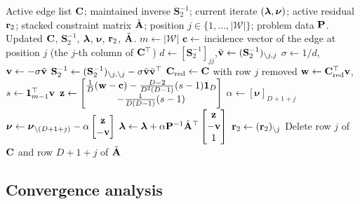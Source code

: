 \begin{algorithm}[H]
	\caption{Active-set KKT update when removing the edge at position $j$}
	\label{alg:active_set_remove_edge}
	\begin{algorithmic}[1]
		\renewcommand{\algorithmicrequire}{\textbf{Input:}}
		\renewcommand{\algorithmicensure}{\textbf{Output:}}
		\Require Active edge list $\C$; maintained inverse $\mathbf{S}_2^{-1}$; current iterate $(\lh,\boldsymbol{\nu})$; active residual $\r_2$; stacked constraint matrix $\tilde{\A}$; position $j\in\{1,\dots,|\mathcal{W}|\}$; problem data $\P$.
		\Ensure Updated $\C$, $\mathbf{S}_2^{-1}$, $\lh$, $\boldsymbol{\nu}$, $\r_2$, $\tilde{\A}$.
		\State $m\gets|\mathcal{W}|$
		\State $\c\gets$ incidence vector of the edge at position $j$ (the $j$-th column of $\C^\top$)
		\State $d\gets[\mathbf{S}_2^{-1}]_{jj}$,\quad $\tilde{\v}\gets(\mathbf{S}_2^{-1})_{\setminus j,j}$
		\State $\sigma\gets 1/d$,\quad $\v\gets-\sigma\tilde{\v}$
		\State $\mathbf{S}_2^{-1}\gets(\mathbf{S}_2^{-1})_{\setminus j,\setminus j}-\sigma\tilde{\v}\tilde{\v}^\top$
		\State $\C_{\text{red}}\gets\C$ with row $j$ removed
		\State $\w\gets\C_{\text{red}}^\top\v$,\quad $s\gets\mathbf{1}_{m-1}^\top\v$
		\State $\z\gets\begin{bmatrix}\frac{1}{D}(\w-\c)-\frac{D-2}{D^2(D-1)}(s-1)\mathbf{1}_D\\ -\frac{1}{D(D-1)}(s-1)\end{bmatrix}$
		\State $\alpha\gets[\boldsymbol{\nu}]_{D+1+j}$
		\State $\boldsymbol{\nu}\gets\boldsymbol{\nu}_{\setminus(D+1+j)}-\alpha\begin{bmatrix}\z\\-\v\end{bmatrix}$
		\State $\lh\gets\lh+\alpha\P^{-1}\tilde{\A}^\top\begin{bmatrix}\z\\-\v\\1\end{bmatrix}$
		\State $\r_2\gets(\r_2)_{\setminus j}$
		\State Delete row $j$ of $\C$ and row $D+1+j$ of $\tilde{\A}$
	\end{algorithmic}
\end{algorithm}

\subsection{Convergence analysis}
\label{sec:as_conv_analysis}

